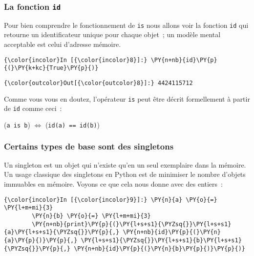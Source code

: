     \hypertarget{la-fonction-id}{%
\subsubsection{\texorpdfstring{La fonction
\texttt{id}}{La fonction id}}\label{la-fonction-id}}

    Pour bien comprendre le fonctionnement de \texttt{is} nous allons voir
la fonction \texttt{id} qui retourne un identificateur unique pour
chaque objet~; un modèle mental acceptable est celui d'adresse mémoire.

    \begin{Verbatim}[commandchars=\\\{\},frame=single,framerule=0.3mm,rulecolor=\color{cellframecolor}]
{\color{incolor}In [{\color{incolor}8}]:} \PY{n+nb}{id}\PY{p}{(}\PY{k+kc}{True}\PY{p}{)}
\end{Verbatim}


\begin{Verbatim}[commandchars=\\\{\},frame=single,framerule=0.3mm,rulecolor=\color{cellframecolor}]
{\color{outcolor}Out[{\color{outcolor}8}]:} 4424115712
\end{Verbatim}
            
    Comme vous vous en doutez, l'opérateur \texttt{is} peut être décrit
formellement à partir de \texttt{id} comme ceci~:

(\texttt{a\ is\ b}) \(\Longleftrightarrow\) (\texttt{id(a)\ ==\ id(b)})

    \hypertarget{certains-types-de-base-sont-des-singletons}{%
\subsubsection{Certains types de base sont des
singletons}\label{certains-types-de-base-sont-des-singletons}}

    Un singleton est un objet qui n'existe qu'en un seul exemplaire dans la
mémoire. Un usage classique des singletons en Python est de minimiser le
nombre d'objets immuables en mémoire. Voyons ce que cela nous donne avec
des entiers~:

    \begin{Verbatim}[commandchars=\\\{\},frame=single,framerule=0.3mm,rulecolor=\color{cellframecolor}]
{\color{incolor}In [{\color{incolor}9}]:} \PY{n}{a} \PY{o}{=} \PY{l+m+mi}{3}
        \PY{n}{b} \PY{o}{=} \PY{l+m+mi}{3}
        \PY{n+nb}{print}\PY{p}{(}\PY{l+s+s1}{\PYZsq{}}\PY{l+s+s1}{a}\PY{l+s+s1}{\PYZsq{}}\PY{p}{,} \PY{n+nb}{id}\PY{p}{(}\PY{n}{a}\PY{p}{)}\PY{p}{,} \PY{l+s+s1}{\PYZsq{}}\PY{l+s+s1}{b}\PY{l+s+s1}{\PYZsq{}}\PY{p}{,} \PY{n+nb}{id}\PY{p}{(}\PY{n}{b}\PY{p}{)}\PY{p}{)}
\end{Verbatim}


